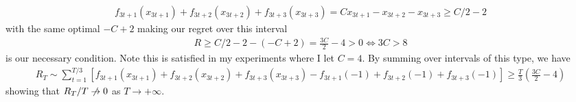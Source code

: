 \documentclass{article}
\newcommand{\1}{\mathbf{1}}                 %
\begin{document}
\begin{align*}
f_{3t+1}(x_{3t+1}) + f_{3t+2}(x_{3t+2}) + f_{3t+3}(x_{3t+3}) = C x_{3t+1} - x_{3t+2} - x_{3t+3} \geq C/2 - 2
\end{align*} 
with the same optimal \(-C+2\) making our regret over this interval 
\begin{align*}
R \geq C/2 - 2 - (-C+2) = \frac{3C}{2} - 4 > 0 \iff 3C > 8 
\end{align*}
is our necessary condition. Note this is satisfied in my experiments where I let \(C=4\). By summing over intervals of this type, we have 
\begin{align*}
R_T \sim \sum_{t=1}^{T/3}  [f_{3t+1}(x_{3t+1}) + f_{3t+2}(x_{3t+2}) + f_{3t+3}(x_{3t+3}) - f_{3t+1}(-1) + f_{3t+2}(-1) + f_{3t+3}(-1)] \geq \frac{T}{3} \left(\frac{3C}{2} - 4\right)
\end{align*}
showing that \(R_T/T \centernot\to 0\) as \(T\to+\infty\). 
\end{document}
